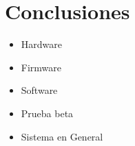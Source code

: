 \chapter{Conclusiones}

\begin{itemize}
	\item Hardware
	\item Firmware
	\item Software
	\item Prueba beta
	\item Sistema en General	
\end{itemize}